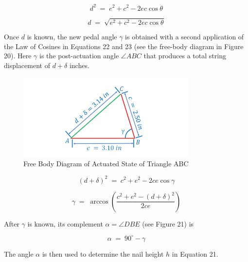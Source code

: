 \documentclass[12pt]{article}
\theoremstyle{definition} %
\theoremstyle{plain} %
\begin{document}
\begin{equation}
  d^{2} \;=\; e^{2} + c^{2} - 2ec\cos\theta
  \tag{20}
\end{equation}

\begin{equation}
  d \;=\; \sqrt{e^{2} + c^{2} - 2ec\cos\theta}
  \tag{21}
\end{equation}

Once $d$ is known, the new pedal angle $\gamma$ is obtained with a second
application of the Law of Cosines in Equations 22 and 23 (see the free-body
diagram in Figure 20).  Here $\gamma$ is the post-actuation angle
$\angle ABC$ that produces a total string displacement of
$d + \delta$ inches.

\begin{figure}[htbp]
  \centering
  \includegraphics[width=0.8\textwidth]{classes/Mathematics-of-Guitar-Strings/06-10/fgs/fig20.png}
  \caption{Free Body Diagram of Actuated State of Triangle ABC}
  \label{fig:}
\end{figure}

\begin{equation}
  (d+\delta)^{2}
  \;=\;
  c^{2} + e^{2} - 2ce\cos\gamma
  \tag{22}
\end{equation}

\begin{equation}
  \gamma
  \;=\;
  \arccos\!\left(
    \frac{c^{2}+e^{2}-(d+\delta)^{2}}{2ce}
  \right)
  \tag{23}
\end{equation}

After $\gamma$ is known, its complement
$\alpha = \angle DBE$ (see Figure 21) is

\begin{equation}
  \alpha \;=\; 90^{\circ} - \gamma
  \tag{24}
\end{equation}

The angle $\alpha$ is then used to determine the nail height $h$ in
Equation 21.
\end{document}
